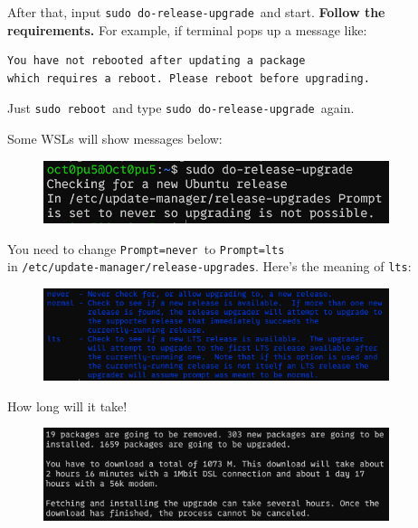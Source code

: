\documentclass[12pt]{ctexart}
\newenvironment{mdquote}
{%
  \par\noindent
  \begin{list}{}{%
      \setlength{\leftmargin}{1em}%
      \setlength{\rightmargin}{0pt}%
      \setlength{\itemindent}{0pt}%
      \setlength{\listparindent}{\parindent}%
      \setlength{\topsep}{0.5\baselineskip}%
  }
  \item[\textbf{>}\ ]\itshape
}
{\end{list}\par}
\begin{document}
After that, input \texttt{sudo\ do-release-upgrade}\ and start.
\textbf{Follow the requirements.} For example, if terminal pops up a
message like:

\begin{adjustwidth}{2em}{0pt}
\begin{verbatim}
You have not rebooted after updating a package 
which requires a reboot. Please reboot before upgrading.
\end{verbatim}
\end{adjustwidth}

Just \texttt{sudo\ reboot}\ and type \texttt{sudo\ do-release-upgrade}\
again.

\begin{mdquote}
Some WSLs will show messages below:


\begin{figure}[H]
    \centering
    \includegraphics[width=0.9\textwidth,keepaspectratio]{assets/Linux/2.3 I upgraded alone/1.png}
\end{figure}

You need to change \texttt{Prompt=never}\ to \texttt{Prompt=lts}\\
in \texttt{/etc/update-manager/release-upgrades}. Here's
the meaning of \texttt{lts}:

\begin{figure}[H]
    \centering
    \includegraphics[width=0.9\textwidth,keepaspectratio]{assets/Linux/2.3 I upgraded alone/2.png}
\end{figure}

\end{mdquote}

How long will it take!

\begin{figure}[H]
    \centering
    \includegraphics[width=0.9\textwidth,keepaspectratio]{assets/Linux/2.3 I upgraded alone/3.png}
\end{figure}
\end{document}
